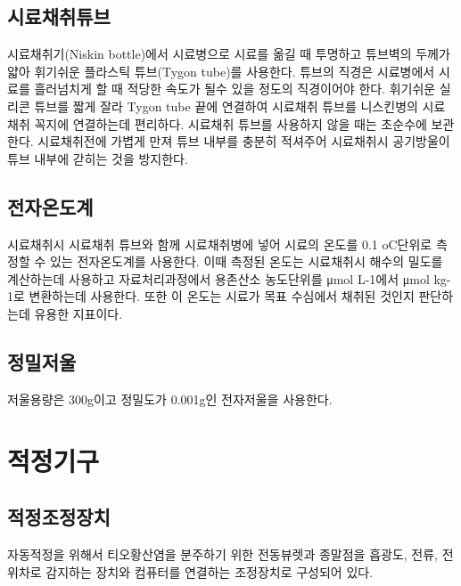 \documentclass[
]{book}
\begin{document}
\hypertarget{uxc2dcuxb8ccuxcc44uxcde8uxd29cuxbe0c}{%
\subsection{시료채취튜브}\label{uxc2dcuxb8ccuxcc44uxcde8uxd29cuxbe0c}}

시료채취기(Niskin bottle)에서 시료병으로 시료를 옮길 때 투명하고 튜브벽의 두께가 얇아 휘기쉬운 플라스틱 튜브(Tygon tube)를 사용한다. 튜브의 직경은 시료병에서 시료를 흘러넘치게 할 때 적당한 속도가 될수 있을 정도의 직경이어야 한다. 휘기쉬운 실리콘 튜브를 짧게 잘라 Tygon tube 끝에 연결하여 시료채취 튜브를 니스킨병의 시료채취 꼭지에 연결하는데 편리하다. 시료채취 튜브를 사용하지 않을 때는 초순수에 보관한다. 시료채취전에 가볍게 만져 튜브 내부를 충분히 적셔주어 시료채취시 공기방울이 튜브 내부에 갇히는 것을 방지한다.

\hypertarget{uxc804uxc790uxc628uxb3c4uxacc4}{%
\subsection{전자온도계}\label{uxc804uxc790uxc628uxb3c4uxacc4}}

시료채취시 시료채취 튜브와 함께 시료채취병에 넣어 시료의 온도를 0.1 oC단위로 측정할 수 있는 전자온도계를 사용한다. 이때 측정된 온도는 시료채취시 해수의 밀도를 계산하는데 사용하고 자료처리과정에서 용존산소 농도단위를 μmol L-1에서 μmol kg-1로 변환하는데 사용한다. 또한 이 온도는 시료가 목표 수심에서 채취된 것인지 판단하는데 유용한 지표이다.

\hypertarget{uxc815uxbc00uxc800uxc6b8}{%
\subsection{정밀저울}\label{uxc815uxbc00uxc800uxc6b8}}

저울용량은 300g이고 정밀도가 0.001g인 전자저울을 사용한다.

\hypertarget{uxc801uxc815uxae30uxad6c}{%
\section{적정기구}\label{uxc801uxc815uxae30uxad6c}}

\hypertarget{uxc801uxc815uxc870uxc815uxc7a5uxce58}{%
\subsection{적정조정장치}\label{uxc801uxc815uxc870uxc815uxc7a5uxce58}}

자동적정을 위해서 티오황산염을 분주하기 위한 전동뷰렛과 종말점을 흡광도, 전류, 전위차로 감지하는 장치와 컴퓨터를 연결하는 조정장치로 구성되어 있다.
\end{document}
